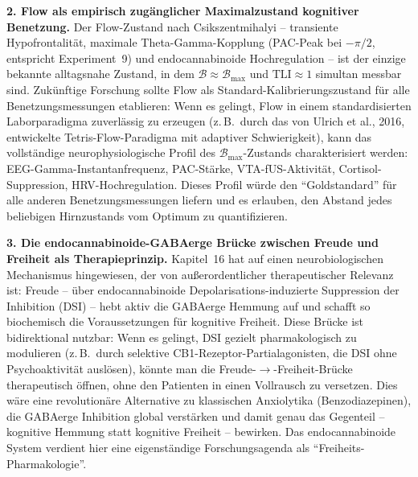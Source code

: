 ﻿\documentclass[12pt,a4paper]{report}
\theoremstyle{plain}
\theoremstyle{definition}
\theoremstyle{remark}
\begin{document}
	\textbf{2. Flow als empirisch zugänglicher Maximalzustand kognitiver
		Benetzung.}
	Der Flow-Zustand nach Csikszentmihalyi -- transiente Hypofrontalität,
	maximale Theta-Gam\-ma-Kopplung (PAC-Peak bei $-\pi/2$, entspricht
	Experiment~9) und endocannabinoide Hochregulation -- ist der
	einzige bekannte alltagsnahe Zustand, in dem $\mathcal{B} \approx
	\mathcal{B}_{\max}$ und $\mathrm{TLI} \approx 1$ simultan messbar sind.
	Zukünftige Forschung sollte Flow als Standard-Kalibrie\-rungszustand
	für alle Benetzungsmessungen etablieren:
	Wenn es gelingt, Flow in einem standardisierten Laborparadigma
	zuverlässig zu erzeugen (z.\,B.\ durch das von Ulrich et al., 2016,
	entwickelte Tetris-Flow-Paradigma mit adaptiver Schwierigkeit),
	kann das vollständige neurophysiologische Profil des
	$\mathcal{B}_{\max}$-Zustands charakterisiert werden:
	EEG-Gamma-Instantanfrequenz, PAC-Stärke, VTA-fUS-Aktivität,
	Cortisol-Suppression, HRV-Hochregulation.
	Dieses Profil würde den ``Goldstandard'' für alle anderen
	Benetzungsmessungen liefern und es erlauben, den Abstand jedes
	beliebigen Hirnzustands vom Optimum zu quantifizieren.

	\textbf{3. Die endocannabinoide-GABAerge Brücke zwischen Freude und Freiheit
		als Therapieprinzip.}
	Kapitel~16 hat auf einen neurobiologischen Mechanismus hingewiesen,
	der von außerordentlicher therapeutischer Relevanz ist:
	Freude -- über endocannabinoide Depolarisations-induzierte
	Suppression der Inhibition (DSI) -- hebt aktiv die GABAerge
	Hemmung auf und schafft so biochemisch die Voraussetzungen
	für kognitive Freiheit.
	Diese Brücke ist bidirektional nutzbar: Wenn es gelingt, DSI
	gezielt pharmakologisch zu modulieren (z.\,B.\ durch selektive
	CB1-Rezeptor-Partialagonisten, die DSI ohne Psychoaktivität
	auslösen), könnte man die Freude-$\to$-Freiheit-Brücke
	therapeutisch öffnen, ohne den Patienten in einen
	Vollrausch zu versetzen.
	Dies wäre eine revolutionäre Alternative zu klassischen Anxiolytika
	(Benzodiazepinen), die GABAerge Inhibition global verstärken
	und damit genau das Gegenteil -- kognitive Hemmung statt
	kognitive Freiheit -- bewirken.
	Das endocannabinoide System verdient hier eine eigenständige
	Forschungsagenda als ``Freiheits-Pharmakologie''.
\end{document}
